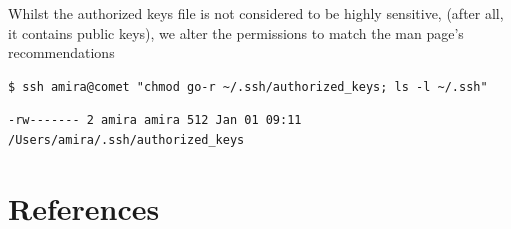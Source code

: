 \documentclass[
]{krantz}
\begin{document}
Whilst the authorized keys file is not considered to be highly sensitive,
(after all, it contains public keys), we alter the permissions to match
the man page's recommendations

\begin{verbatim}
$ ssh amira@comet "chmod go-r ~/.ssh/authorized_keys; ls -l ~/.ssh"
\end{verbatim}

\begin{verbatim}
-rw------- 2 amira amira 512 Jan 01 09:11 /Users/amira/.ssh/authorized_keys
\end{verbatim}

\hypertarget{references}{%
\chapter{References}\label{references}}
\end{document}
